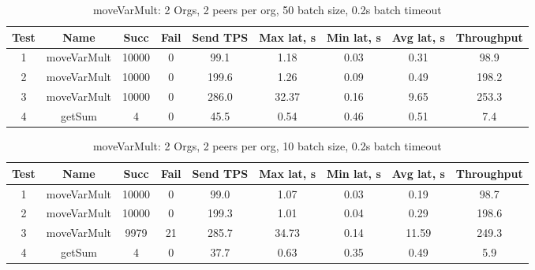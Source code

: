 \begin{appendices}
\begin{table}[H]
\begin{center}
\begin{tabular}{ |c|c|c|c|c|c|c|c|c| }
 \hline
  Test & Name & Succ  & Fail & Send TPS & Max lat, s & Min lat, s & Avg lat, s & Throughput \\
 \hline
 \hline
 1    & moveVarMult & 10000 & 0    & 99.1  & 1.18      & 0.03      & 0.31      & 98.9  \\
 \hline
 2    & moveVarMult & 10000 & 0    & 199.6 & 1.26      & 0.09      & 0.49      & 198.2 \\
 \hline
 3    & moveVarMult & 10000 & 0    & 286.0 & 32.37     & 0.16      & 9.65      & 253.3 \\
 \hline
 4    & getSum      & 4     & 0    & 45.5  & 0.54      & 0.46      & 0.51      & 7.4   \\
 \hline
\end{tabular}
\end{center}
\caption{moveVarMult: 2 Orgs, 2 peers per org, 50 batch size, 0.2s batch timeout}
\end{table}

\begin{table}[H]
\begin{center}
\begin{tabular}{ |c|c|c|c|c|c|c|c|c| }
 \hline
  Test & Name & Succ  & Fail & Send TPS & Max lat, s & Min lat, s & Avg lat, s & Throughput \\
 \hline
 \hline
 1    & moveVarMult & 10000 & 0    & 99.0  & 1.07      & 0.03      & 0.19      & 98.7   \\
 \hline
 2    & moveVarMult & 10000 & 0    & 199.3 & 1.01      & 0.04      & 0.29      & 198.6  \\
 \hline
 3    & moveVarMult & 9979  & 21   & 285.7 & 34.73     & 0.14      & 11.59     & 249.3  \\
 \hline
 4    & getSum      & 4     & 0    & 37.7  & 0.63      & 0.35      & 0.49      & 5.9    \\
 \hline
\end{tabular}
\end{center}
\caption{moveVarMult: 2 Orgs, 2 peers per org, 10 batch size, 0.2s batch timeout}
\end{table}


\end{appendices}

